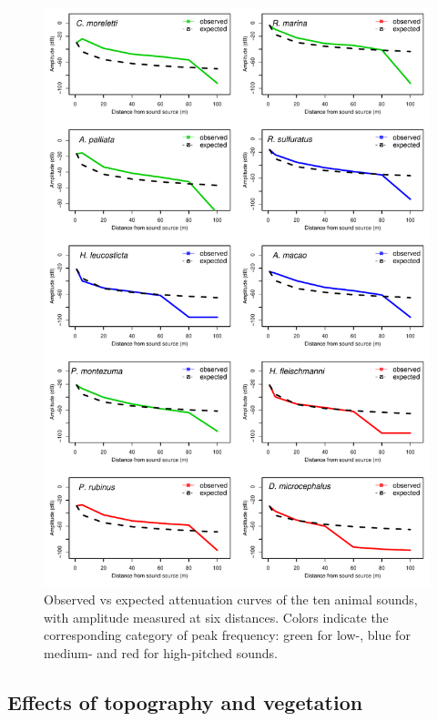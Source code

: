 \documentclass[fleqn,10pt,lineno]{wlpeerj} %
\begin{document}
\begin{figure}

{\centering \includegraphics[width=1\linewidth]{ASR_MyPaper_2020_files/figure-latex/curvesxspp-1} 

}

\caption{Observed vs expected attenuation curves of the ten animal sounds, with amplitude measured at six distances. Colors indicate the corresponding category of peak frequency: green for low-, blue for medium- and red for high-pitched sounds.\label{fig:curvesxspp}}\label{fig:curvesxspp}
\end{figure}

\hypertarget{effects-of-topography-and-vegetation-1}{%
\subsection*{Effects of topography and vegetation}\label{effects-of-topography-and-vegetation-1}}
\end{document}

